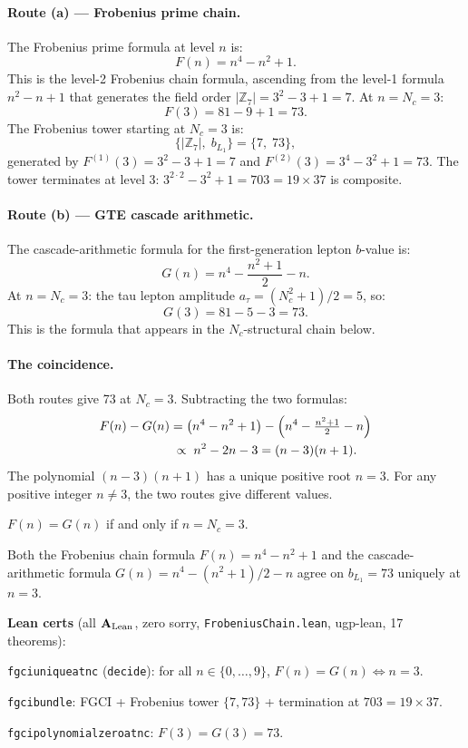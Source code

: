 \documentclass[11pt,openany]{book}
\theoremstyle{remark}
\newcommand{\lean}[1]{%
  \penalty-100
  \begingroup\def\_{\textunderscore\allowbreak}\texttt{#1}\endgroup}
\newcommand{\CatAL}{\ensuremath{\textbf{A}_{\rm Lean}}}
\begin{document}
\paragraph{Route (a) --- Frobenius prime chain.}
The Frobenius prime formula at level $n$ is:
\begin{equation}
  F(n) = n^4 - n^2 + 1.
  \label{eq:frobenius}
\end{equation}
This is the level-2 Frobenius chain formula, ascending from the level-1 formula
$n^2 - n + 1$ that generates the field order $|\mathbb{Z}_7| = 3^2 - 3 + 1 = 7$.
At $n = N_c = 3$:
\[
F(3) = 81 - 9 + 1 = 73.
\]
The Frobenius tower starting at $N_c = 3$ is:
\[
\{|{\mathbb{Z}_7}|,\; b_{L_1}\} = \{7,\; 73\},
\]
generated by $F^{(1)}(3) = 3^2-3+1 = 7$ and $F^{(2)}(3) = 3^4-3^2+1 = 73$.
The tower terminates at level 3: $3^{2\cdot2}-3^2+1 = 703 = 19 \times 37$ is composite.

\paragraph{Route (b) --- GTE cascade arithmetic.}
The cascade-arithmetic formula for the first-generation lepton $b$-value is:
\begin{equation}
  G(n) = n^4 - \frac{n^2+1}{2} - n.
  \label{eq:cascade}
\end{equation}
At $n = N_c = 3$: the tau lepton amplitude $a_\tau = (N_c^2+1)/2 = 5$, so:
\[
G(3) = 81 - 5 - 3 = 73.
\]
This is the formula that appears in the $N_c$-structural chain below.

\paragraph{The coincidence.}
Both routes give 73 at $N_c = 3$. Subtracting the two formulas:
\begin{align}
  F(n) - G(n) &= \left(n^4 - n^2 + 1\right) - \left(n^4 - \tfrac{n^2+1}{2} - n\right) \notag \\
  &\;\propto\; n^2 - 2n - 3 = (n-3)(n+1).
  \label{eq:fgci_poly}
\end{align}
The polynomial $(n-3)(n+1)$ has a unique positive root $n = 3$. For any positive
integer $n \neq 3$, the two routes give different values.

\begin{tcolorbox}[colback=orange!5,colframe=orange!60,
  title={The Frobenius-Generation Coincidence Identity (FGCI) (\CatAL)}]
$F(n) = G(n)$ if and only if $n = N_c = 3$.

Both the Frobenius chain formula $F(n) = n^4-n^2+1$ and the cascade-arithmetic
formula $G(n) = n^4-(n^2+1)/2-n$ agree on $b_{L_1} = 73$ uniquely at $n = 3$.

\smallskip\noindent
\textbf{Lean certs} (all \CatAL, zero sorry, \texttt{FrobeniusChain.lean}, ugp-lean,
17 theorems):

\lean{fgci\_unique\_at\_nc} (\texttt{decide}): for all $n \in \{0,\ldots,9\}$,
$F(n) = G(n) \Leftrightarrow n = 3$.

\lean{fgci\_bundle}: FGCI + Frobenius tower $\{7,73\}$ + termination at $703 = 19\times 37$.

\lean{fgci\_polynomial\_zero\_at\_nc}: $F(3) = G(3) = 73$.
\end{tcolorbox}
\end{document}
